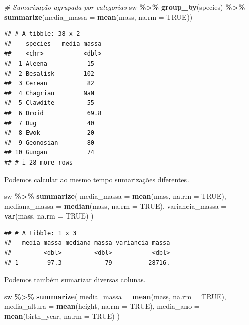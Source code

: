 \documentclass[
]{book}
\newenvironment{Shaded}{\begin{snugshade}}{\end{snugshade}}
\newcommand{\AttributeTok}[1]{\textcolor[rgb]{0.13,0.29,0.53}{#1}}
\newcommand{\CommentTok}[1]{\textcolor[rgb]{0.56,0.35,0.01}{\textit{#1}}}
\newcommand{\ConstantTok}[1]{\textcolor[rgb]{0.56,0.35,0.01}{#1}}
\newcommand{\FunctionTok}[1]{\textcolor[rgb]{0.13,0.29,0.53}{\textbf{#1}}}
\newcommand{\NormalTok}[1]{#1}
\newcommand{\SpecialCharTok}[1]{\textcolor[rgb]{0.81,0.36,0.00}{\textbf{#1}}}
\begin{document}
\begin{Shaded}
\begin{Highlighting}[]
\CommentTok{\# Sumarização agrupada por categorias}
\NormalTok{sw }\SpecialCharTok{\%\textgreater{}\%}
  \FunctionTok{group\_by}\NormalTok{(species) }\SpecialCharTok{\%\textgreater{}\%}
  \FunctionTok{summarize}\NormalTok{(}\AttributeTok{media\_massa =} \FunctionTok{mean}\NormalTok{(mass, }\AttributeTok{na.rm =} \ConstantTok{TRUE}\NormalTok{))}
\end{Highlighting}
\end{Shaded}

\begin{verbatim}
## # A tibble: 38 x 2
##    species   media_massa
##    <chr>           <dbl>
##  1 Aleena           15  
##  2 Besalisk        102  
##  3 Cerean           82  
##  4 Chagrian        NaN  
##  5 Clawdite         55  
##  6 Droid            69.8
##  7 Dug              40  
##  8 Ewok             20  
##  9 Geonosian        80  
## 10 Gungan           74  
## # i 28 more rows
\end{verbatim}

Podemos calcular ao mesmo tempo sumarizações diferentes.

\begin{Shaded}
\begin{Highlighting}[]
\NormalTok{sw }\SpecialCharTok{\%\textgreater{}\%} \FunctionTok{summarize}\NormalTok{(}
  \AttributeTok{media\_massa =} \FunctionTok{mean}\NormalTok{(mass, }\AttributeTok{na.rm =} \ConstantTok{TRUE}\NormalTok{),}
  \AttributeTok{mediana\_massa =} \FunctionTok{median}\NormalTok{(mass, }\AttributeTok{na.rm =} \ConstantTok{TRUE}\NormalTok{),}
  \AttributeTok{variancia\_massa =} \FunctionTok{var}\NormalTok{(mass, }\AttributeTok{na.rm =} \ConstantTok{TRUE}\NormalTok{)}
\NormalTok{)}
\end{Highlighting}
\end{Shaded}

\begin{verbatim}
## # A tibble: 1 x 3
##   media_massa mediana_massa variancia_massa
##         <dbl>         <dbl>           <dbl>
## 1        97.3            79          28716.
\end{verbatim}

Podemos também sumarizar diversas colunas.

\begin{Shaded}
\begin{Highlighting}[]
\NormalTok{sw }\SpecialCharTok{\%\textgreater{}\%} \FunctionTok{summarize}\NormalTok{(}
  \AttributeTok{media\_massa =} \FunctionTok{mean}\NormalTok{(mass, }\AttributeTok{na.rm =} \ConstantTok{TRUE}\NormalTok{),}
  \AttributeTok{media\_altura =} \FunctionTok{mean}\NormalTok{(height, }\AttributeTok{na.rm =} \ConstantTok{TRUE}\NormalTok{),}
  \AttributeTok{media\_ano =} \FunctionTok{mean}\NormalTok{(birth\_year, }\AttributeTok{na.rm =} \ConstantTok{TRUE}\NormalTok{)}
\NormalTok{)}
\end{Highlighting}
\end{Shaded}
\end{document}
